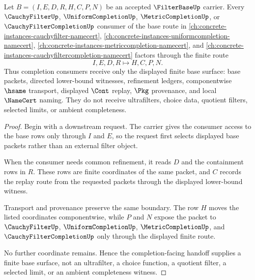 \begin{theorem}
\label{thm:filter-base-cauchyfilter-handoff}
Let $B=(I,E,D,R,H,C,P,N)$ be an accepted $\FilterBaseUp$ carrier. Every $\CauchyFilterUp$, $\UniformCompletionUp$, $\MetricCompletionUp$, or $\CauchyFilterCompletionUp$ consumer of the base route in \autoref{ch:concrete-instances-cauchyfilter-namecert}, \autoref{ch:concrete-instances-uniformcompletion-namecert}, \autoref{ch:concrete-instances-metriccompletion-namecert}, and \autoref{ch:concrete-instances-cauchyfiltercompletion-namecert} factors through the finite route
$$
I,E,D,R \longmapsto H,C,P,N .
$$
Thus completion consumers receive only the displayed finite base surface: base packets, directed lower-bound witnesses, refinement ledgers, componentwise $\hsame$ transport, displayed $\Cont$ replay, $\Pkg$ provenance, and local $\NameCert$ naming. They do not receive ultrafilters, choice data, quotient filters, selected limits, or ambient completeness.
\end{theorem}
\begin{proof}
Begin with a downstream request. The carrier gives the consumer access to the base rows only through $I$ and $E$, so the request first selects displayed base packets rather than an external filter object.

When the consumer needs common refinement, it reads $D$ and the containment rows in $R$. These rows are finite coordinates of the same packet, and $C$ records the replay route from the requested packets through the displayed lower-bound witness.

Transport and provenance preserve the same boundary. The row $H$ moves the listed coordinates componentwise, while $P$ and $N$ expose the packet to $\CauchyFilterUp$, $\UniformCompletionUp$, $\MetricCompletionUp$, and $\CauchyFilterCompletionUp$ only through the displayed finite route.

No further coordinate remains. Hence the completion-facing handoff supplies a finite base surface, not an ultrafilter, a choice function, a quotient filter, a selected limit, or an ambient completeness witness.
\end{proof}

